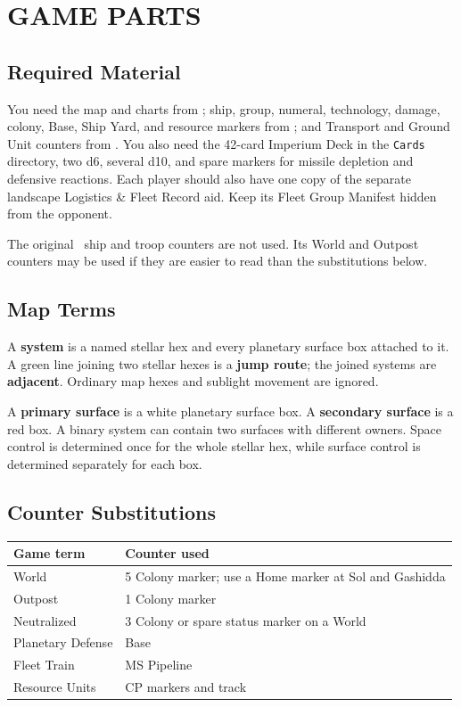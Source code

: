 \section{GAME PARTS}

\subsection{Required Material}

You need the map and charts from \Imperium; ship, group, numeral, technology,
damage, colony, Base, Ship Yard, and resource markers from \SpaceEmpires; and
Transport and Ground Unit counters from \CloseEncounters. You also need the
42-card Imperium Deck in the \texttt{Cards} directory, two d6, several d10,
and spare markers for missile depletion and defensive reactions.
Each player should also have one copy of the separate landscape Logistics \&
Fleet Record aid. Keep its Fleet Group Manifest hidden from the opponent.

The original \Imperium\ ship and troop counters are not used. Its World and
Outpost counters may be used if they are easier to read than the substitutions
below.

\subsection{Map Terms}

A \textbf{system} is a named stellar hex and every planetary surface box
attached to it. A green line joining two stellar hexes is a \textbf{jump
route}; the joined systems are \textbf{adjacent}. Ordinary map hexes and
sublight movement are ignored.

A \textbf{primary surface} is a white planetary surface box. A \textbf{secondary
surface} is a red box. A binary system can contain two surfaces with different
owners. Space control is determined once for the whole stellar hex, while
surface control is determined separately for each box.

\subsection{Counter Substitutions}

\begin{tabularx}{\columnwidth}{@{}lX@{}}
\toprule
Game term & Counter used \\
\midrule
World & 5 Colony marker; use a Home marker at Sol and Gashidda \\
Outpost & 1 Colony marker \\
Neutralized & 3 Colony or spare status marker on a World \\
Planetary Defense & Base \\
Fleet Train & MS Pipeline \\
Resource Units & CP markers and track \\
\bottomrule
\end{tabularx}

